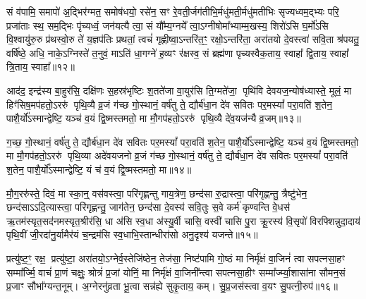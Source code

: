 {\anuvakamend[{चक्षु॑र॒ष्टाच॑त्वारिꣳशच्च। (7)}]}

सं व॑पामि॒ समापो॑ अ॒द्भिर॑ग्मत॒ समोष॑धयो॒ रसे॑न॒ सꣳ रे॒वती॒र्जग॑तीभि॒र्मधु॑मती॒र्मधु॑मतीभिः सृज्यध्वम॒द्भ्यः परि॒ प्रजा॑ताः स्थ॒ सम॒द्भिः पृ॑च्यध्वं॒ जन॑यत्यै त्वा॒ सं यौ᳚म्य॒ग्नये᳚ त्वा॒\-ऽग्नीषोमा᳚भ्याम्म॒खस्य॒ शिरो॑\-ऽसि घ॒र्मो॑\-ऽसि वि॒श्वायु॑रु॒रु प्र॑थस्वो॒रु ते॑ य॒ज्ञप॑तिः प्रथतां॒ त्वचं॑ गृह्णीष्वा॒\-ऽन्तरि॑त॒ꣳ॒ रक्षो॒\-ऽन्तरि॑ता॒ अरा॑तयो दे॒वस्त्वा॑ सवि॒ता श्र॑पयतु॒ वर्\mbox{}षि॑ष्ठे॒ अधि॒ नाके॒\-ऽग्निस्ते॑ त॒नुवं॒ मा\-ऽति॑ धा॒गग्ने॑ ह॒व्यꣳ र॑क्षस्व॒ सं ब्रह्म॑णा पृच्यस्वैक॒ताय॒ स्वाहा᳚ द्वि॒ताय॒ स्वाहा᳚ त्रि॒ताय॒ स्वाहा᳚॥१२॥

{\anuvakamend[{स॒वि॒ता द्वाविꣳ॑शतिश्च। (8)}]}

आद॑द॒ इन्द्र॑स्य बा॒हुर॑सि॒ दक्षि॑णः स॒हस्र॑भृष्टिः श॒तते॑जा वा॒युर॑सि ति॒ग्मते॑जा॒ पृथि॑वि देवयज॒न्योष॑ध्यास्ते॒ मूलं॒ मा हिꣳ॑सिष॒मप॑हतो॒\-ऽररु॑ पृथि॒व्यै व्र॒जं ग॑च्छ गो॒स्थानं॒ वर्\mbox{}ष॑तु ते॒ द्यौर्ब॑धा॒न दे॑व सवितः पर॒मस्यां᳚ परा॒वति॑ श॒तेन॒ पाशै॒र्यो᳚\-ऽस्मान्द्वेष्टि॒ यञ्च॑ व॒यं द्वि॒ष्मस्तमतो॒ मा मौ॒गप॑हतो॒\-ऽररु॑ पृथि॒व्यै दे॑व॒यज॑न्यै व्र॒जम्॥१३॥

ग॒च्छ॒ गो॒स्थानं॒ वर्\mbox{}ष॑तु ते॒ द्यौर्ब॑धा॒न दे॑व सवितः पर॒मस्यां᳚ परा॒वति॑ श॒तेन॒ पाशै॒र्यो᳚\-ऽस्मान्द्वेष्टि॒ यञ्च॑ व॒यं द्वि॒ष्मस्तमतो॒ मा मौ॒गप॑हतो॒\-ऽररु॑ पृथि॒व्या अदे॑वयजनो व्र॒जं ग॑च्छ गो॒स्थानं॒ वर्\mbox{}ष॑तु ते॒ द्यौर्ब॑धा॒न दे॑व सवितः पर॒मस्यां᳚ परा॒वति॑ श॒तेन॒ पाशै॒र्यो᳚\-ऽस्मान्द्वेष्टि॒ यं च॑ व॒यं द्वि॒ष्मस्तमतो॒ मा॥१४॥

मौ॒ग॒ररु॑स्ते॒ दिवं॒ मा स्का॒न्॒ वस॑वस्त्वा॒ परि॑गृह्णन्तु गाय॒त्रेण॒ छन्द॑सा रु॒द्रास्त्वा॒ परि॑गृह्णन्तु॒ त्रैष्टु॑भेन॒ छन्द॑सा\-ऽ\-ऽदि॒त्यास्त्वा॒ परि॑गृह्णन्तु॒ जाग॑तेन॒ छन्द॑सा दे॒वस्य॑ सवि॒तुः स॒वे कर्म॑ कृण्वन्ति वे॒धस॑ ऋ॒तम॑स्यृत॒सद॑नमस्यृत॒श्रीर॑सि॒ धा अ॑सि स्व॒धा अ॑स्यु॒र्वी चासि॒ वस्वी॑ चासि पु॒रा क्रू॒रस्य॑ वि॒सृपो॑ विरफ्शिन्नुदा॒दाय॑ पृथि॒वीं जी॒रदा॑नु॒र्यामैर॑यं च॒न्द्रम॑सि स्व॒धाभि॒स्तान्धीरा॑सो अनु॒दृश्य॑ यजन्ते॥१५॥

{\anuvakamend[{दे॒व॒यज॑न्यै व्र॒जन्तमतो॒ मा वि॑रफ्शि॒न्नेका॑दश च। (9)}]}

प्रत्यु॑ष्ट॒ꣳ॒ रक्ष॒ प्रत्यु॑ष्टा॒ अरा॑तयो॒\-ऽग्नेर्व॒स्तेजि॑ष्ठेन॒ तेज॑सा॒ निष्ट॑पामि गो॒ष्ठं मा निर्मृ॑क्षं वा॒जिनं॑ त्वा सपत्नसा॒हꣳ सम्मा᳚र्ज्मि॒ वाचं॑ प्रा॒णं चक्षुः॒ श्रोत्रं॑ प्र॒जां योनिं॒ मा निर्मृ॑क्षं वा॒जिनी᳚न्त्वा सपत्नसा॒हीꣳ सम्मा᳚र्ज्म्या॒शासा॑ना सौमन॒सं प्र॒जाꣳ सौभा᳚ग्यन्त॒नूम्। अ॒ग्नेरनु॑व्रता भू॒त्वा सन्न॑ह्ये सुकृ॒ताय॒ कम्। सु॒प्र॒जस॑स्त्वा व॒यꣳ सु॒पत्नी॒रुप॑॥१६॥

